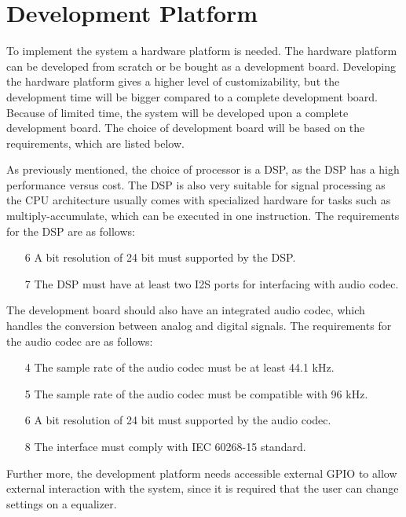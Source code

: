 \chapter{Development Platform}

To implement the system a hardware platform is needed. The hardware platform can be developed from scratch or be bought as a development board. Developing the hardware platform gives a higher level of customizability, but the development time will be bigger compared to a complete development board. Because of limited time, the system will be developed upon a complete development board. The choice of development board will be based on the requirements, which are listed below.

As previously mentioned, the choice of processor is a DSP, as the DSP has a high performance versus cost. The DSP is also very suitable for signal processing as the CPU architecture usually comes with specialized hardware for tasks such as multiply-accumulate, which can be executed in one instruction. The requirements for the DSP are as follows:

\begin{enumerate}
\item[6] A bit resolution of 24 bit must supported by the DSP.\\
\item[7] The DSP must have at least two I2S ports for interfacing with audio codec.
\end{enumerate}

The development board should also have an integrated audio codec, which handles the conversion between analog and digital signals. The requirements for the audio codec are as follows:

\begin{enumerate}
\item[4] The sample rate of the audio codec must be at least 44.1 kHz.\\
\item[5] The sample rate of the audio codec must be compatible with 96 kHz.\\
\item[6] A bit resolution of 24 bit must supported by the audio codec.\\
\item[8] The interface must comply with IEC 60268-15 standard.
\end{enumerate}

Further more, the development platform needs accessible external GPIO to allow external interaction with the system, since it is required that the user can change settings on a equalizer. 


